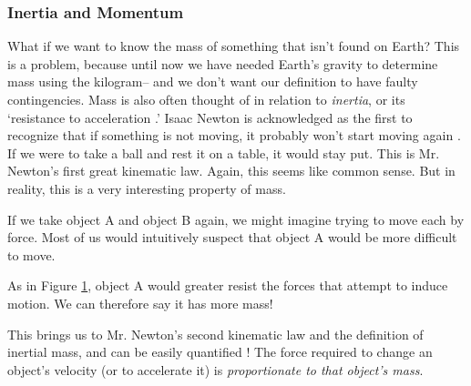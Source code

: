 \documentclass{article}
\begin{document}
            \subsubsection{Inertia and Momentum}
                What if we want to know the mass of something that isn't found on Earth? This is a problem, because until now we have needed Earth's gravity to determine mass using the kilogram-- and we don't want our definition to have faulty contingencies. Mass is also often thought of in relation to \textit{inertia}, or its `resistance to acceleration \cite{Bray}.'
                Isaac Newton is acknowledged as the first to recognize that if something is not moving, it probably won't start moving again \cite{Newton}. If we were to take a ball and rest it on a table, it would stay put. This is Mr. Newton's first great kinematic law.
                Again, this seems like common sense. But in reality, this is a very interesting property of mass.
                \par
                If we take object A and object B again, we might imagine trying to move each by force. Most of us would intuitively suspect that object A would be more difficult to move.

                    \begin{figure}[H]
                        \centering
                         \caption{}\label{fig:2}
                    \end{figure}                    

                As in Figure \ref{fig:2}, object A would greater resist the forces that attempt to induce motion. We can therefore say it has more mass! 
                \par
                This brings us to Mr. Newton's second kinematic law and the definition of inertial mass, and can be easily quantified \cite{Newton}! The force required to change an object's velocity (or to accelerate it) is \emph{proportionate to that object's mass}.
\end{document}
